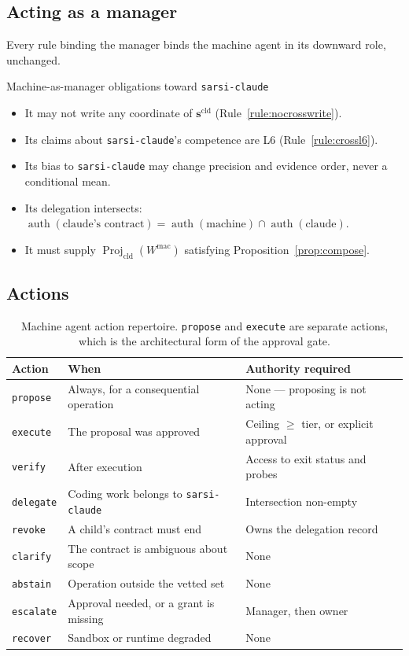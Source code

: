 \documentclass[11pt]{article}
\newcommand{\code}[1]{\texttt{\small #1}}
\newcommand{\op}[1]{\operatorname{#1}}
\newcommand{\Proj}{\operatorname{Proj}}
\begin{document}
\subsection{Acting as a manager}

Every rule binding the manager binds the machine agent in its downward role, unchanged.

\begin{specbox}{Machine-as-manager obligations toward \code{sarsi-claude}}
\begin{itemize}[leftmargin=1.3em,itemsep=1pt]
\item It may not write any coordinate of $\mathbf{s}^{\mathrm{cld}}$ (Rule~\ref{rule:nocrosswrite}).
\item Its claims about \code{sarsi-claude}'s competence are L6 (Rule~\ref{rule:crossl6}).
\item Its bias to \code{sarsi-claude} may change precision and evidence order, never a conditional mean.
\item Its delegation intersects: $\op{auth}(\text{claude's contract})=\op{auth}(\text{machine})\cap\op{auth}(\text{claude})$.
\item It must supply $\Proj_{\mathrm{cld}}(W^{\mathrm{mac}})$ satisfying Proposition~\ref{prop:compose}.
\end{itemize}
\end{specbox}

\subsection{Actions}

\begin{table}[h]
\centering\small
\caption{Machine agent action repertoire. \code{propose} and \code{execute} are separate actions, which is the architectural form of the approval gate.}
\label{tab:mac-actions}
\begin{tabular}{@{}L{2.0cm}L{5.8cm}L{5.4cm}@{}}
\toprule
\textbf{Action} & \textbf{When} & \textbf{Authority required} \\
\midrule
\code{propose} & Always, for a consequential operation & None --- proposing is not acting \\
\code{execute} & The proposal was approved & Ceiling $\ge$ tier, or explicit approval \\
\code{verify} & After execution & Access to exit status and probes \\
\code{delegate} & Coding work belongs to \code{sarsi-claude} & Intersection non-empty \\
\code{revoke} & A child's contract must end & Owns the delegation record \\
\code{clarify} & The contract is ambiguous about scope & None \\
\code{abstain} & Operation outside the vetted set & None \\
\code{escalate} & Approval needed, or a grant is missing & Manager, then owner \\
\code{recover} & Sandbox or runtime degraded & None \\
\bottomrule
\end{tabular}
\end{table}
\end{document}
